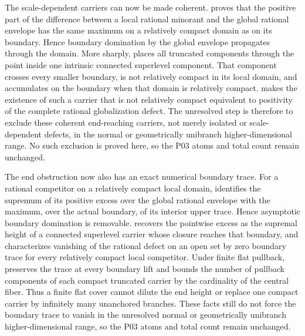 The scale-dependent carriers can now be made coherent.
 proves that the positive
part of the difference between a local rational minorant and the global
rational envelope has the same maximum on a relatively compact domain as on
its boundary.  Hence boundary domination by the global envelope propagates
through the domain.  More sharply,
 places all truncated
components through the point inside one intrinsic connected superlevel
component.  That component crosses every smaller boundary, is not relatively
compact in its local domain, and accumulates on the boundary when that domain
is relatively compact.
 makes the existence of
such a carrier that is not relatively compact equivalent to positivity of the
complete rational globalization defect.  The unresolved step is therefore
to exclude these coherent end-reaching carriers, not merely isolated or
scale-dependent defects, in the normal or geometrically unibranch
higher-dimensional range.  No such exclusion is proved here, so the P03
atoms and total count remain unchanged.

The end obstruction now also has an exact numerical boundary trace.
For a rational competitor on a relatively compact local domain,
 identifies the supremum of
its positive excess over the global rational envelope with the maximum,
over the actual boundary, of its interior upper trace.  Hence asymptotic
boundary domination is removable.
 recovers the pointwise excess as
the supremal height of a connected superlevel carrier whose closure reaches
that boundary, and
 characterizes
vanishing of the rational defect on an open set by zero boundary trace for
every relatively compact local competitor.  Under finite flat pullback,
 preserves the
trace at every boundary lift and bounds the number of pullback components of
each compact truncated carrier by the cardinality of the central fiber.
Thus a finite flat cover cannot dilute the end height or replace one compact
carrier by infinitely many unanchored branches.  These facts still do not
force the boundary trace to vanish in the unresolved normal or geometrically
unibranch higher-dimensional range, so the P03 atoms and total count remain
unchanged.

